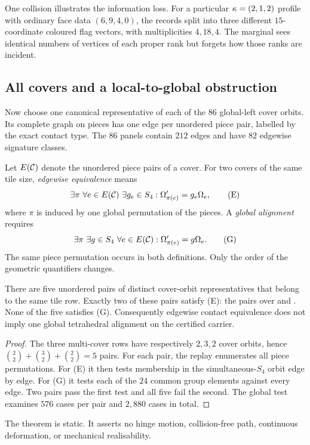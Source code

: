 One collision illustrates the information loss.  For a particular
$\kappa=(2,1,2)$ profile with ordinary face data $(6,9,4,0)$, the records split
into three different $15$-coordinate coloured flag vectors, with
multiplicities $4,18,4$.  The marginal sees identical numbers of vertices of
each proper rank but forgets how those ranks are incident.

\subsection{All covers and a local-to-global obstruction}

Now choose one canonical representative of each of the $86$ global-left
cover orbits.  Its complete graph on pieces has one edge per unordered piece
pair, labelled by the exact contact type.  The $86$ panels contain $212$
edges and have $82$ edgewise signature classes.

Let $E(\mathcal C)$ denote the unordered piece pairs of a cover.  For two covers of
the same tile size, \emph{edgewise equivalence} means
\[
 \exists\pi\ \forall e\in E(\mathcal C)\ \exists g_e\in S_4:
 \Omega'_{\pi(e)}=g_e\Omega_e,
 \tag{E}
\]
where $\pi$ is induced by one global permutation of the pieces.  A
\emph{global alignment} requires
\[
 \exists\pi\ \exists g\in S_4\ \forall e\in E(\mathcal C):
 \Omega'_{\pi(e)}=g\Omega_e.
 \tag{G}
\]
The same piece permutation occurs in both definitions.  Only the order of
the geometric quantifiers changes.

\begin{theorem}
\label{thm:contact-obstruction}
There are five unordered pairs of distinct cover-orbit representatives that
belong to the same tile row.  Exactly two of these pairs satisfy \textup{(E)}:
the pairs over  and .  None of the five
satisfies \textup{(G)}.  Consequently edgewise contact equivalence does not
imply one global tetrahedral alignment on the certified carrier.
\end{theorem}
\begin{proof}
The three multi-cover rows have respectively $2,3,2$ cover orbits, hence
$\binom22+\binom32+\binom22=5$ pairs.  For each pair, the replay enumerates
all piece permutations.  For \textup{(E)} it then tests membership in the
simultaneous-$S_4$ orbit edge by edge.  For \textup{(G)} it tests each of the
$24$ common group elements against every edge.  Two pairs pass the first
test and all five fail the second.  The global test examines $576$ cases per
pair and $2{,}880$ cases in total.
\end{proof}

The theorem is static.  It asserts no hinge motion, collision-free path,
continuous deformation, or mechanical realisability.
